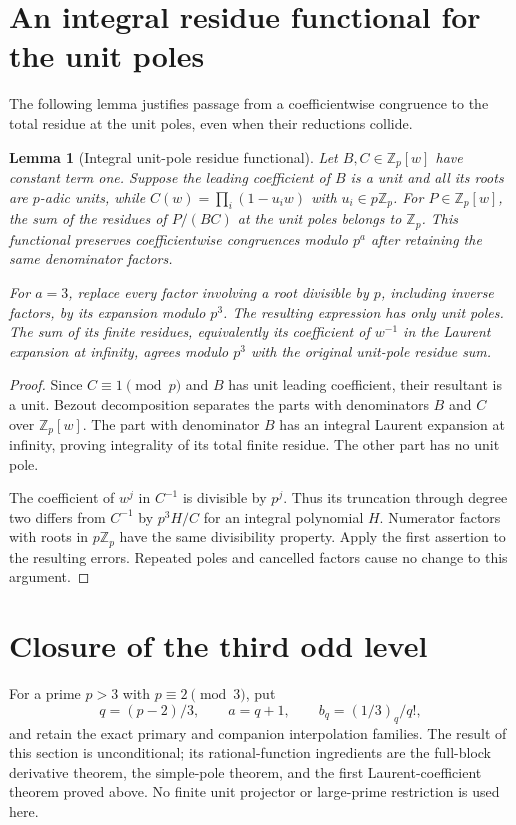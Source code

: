 \documentclass[11pt,letterpaper]{article}
\newtheorem{lemma}[theorem]{Lemma}
\numberwithin{equation}{section}
\begin{document}
\section{An integral residue functional for the unit poles}\label{loc-VIII-23}
The following lemma justifies passage from a coefficientwise
congruence to the total residue at the unit poles, even when their
reductions collide.

\begin{lemma}[Integral unit-pole residue functional]
Let $B,C\in\mathbb Z_p[w]$ have constant term one. Suppose the leading
coefficient of $B$ is a unit and all its roots are $p$-adic units, while
$C(w)=\prod_i(1-u_iw)$ with $u_i\in p\mathbb Z_p$. For
$P\in\mathbb Z_p[w]$, the sum of the residues of $P/(BC)$ at the
unit poles belongs to $\mathbb Z_p$. This functional preserves
coefficientwise congruences modulo $p^a$ after retaining the same
denominator factors.

For $a=3$, replace every factor involving a root divisible by $p$,
including inverse factors, by its expansion modulo $p^3$. The resulting
expression has only unit poles. The sum of its finite residues, equivalently
its coefficient of $w^{-1}$ in the Laurent expansion at infinity, agrees
modulo $p^3$ with the original unit-pole residue sum.
\end{lemma}
\begin{proof}
Since $C\equiv1\pmod p$ and $B$ has unit leading coefficient, their
resultant is a unit. Bezout decomposition separates the parts with
denominators $B$ and $C$ over $\mathbb Z_p[w]$. The part with denominator
$B$ has an integral Laurent expansion at infinity, proving integrality
of its total finite residue. The other part has no unit pole.

The coefficient of $w^j$ in $C^{-1}$ is divisible by $p^j$. Thus its
truncation through degree two differs from $C^{-1}$ by $p^3H/C$ for
an integral polynomial $H$. Numerator factors with roots in $p\mathbb Z_p$
have the same divisibility property. Apply the first assertion to the
resulting errors. Repeated poles and cancelled factors cause no change
to this argument.
\end{proof}


\section{Closure of the third odd level}\label{loc-VIII-24}
\label{VIII-sec:e8-r3-closure}
For a prime \(p>3\) with \(p\equiv2\pmod3\), put
\[
 q=(p-2)/3,\qquad a=q+1,\qquad b_q=(1/3)_q/q!,
\]
and retain the exact primary and companion interpolation families.
The result of this section is unconditional; its rational-function
ingredients are the full-block derivative theorem, the simple-pole
theorem, and the first Laurent-coefficient theorem proved above.
No finite unit projector or large-prime restriction is used here.
\end{document}
